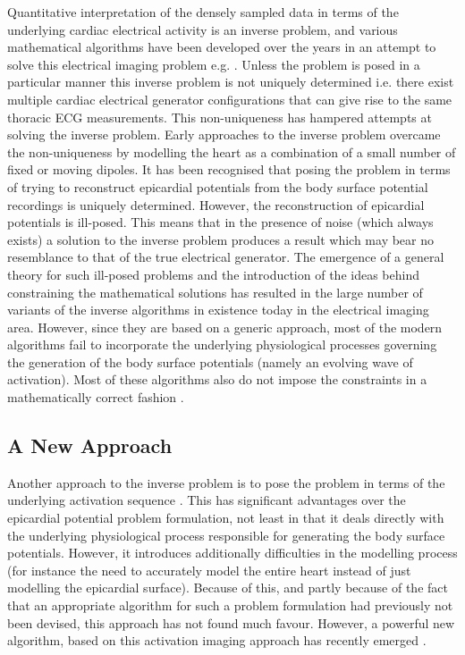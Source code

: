 Quantitative interpretation of the densely sampled data in terms of the
underlying cardiac electrical activity is an inverse problem, and various
mathematical algorithms have been developed over the years in an attempt to
solve this electrical imaging problem 
e.g. \cite{barr:1978,gulrajani:1984,martin:1975,oster:1992}. Unless the problem is
posed in a particular manner this inverse problem is not uniquely determined
i.e. there exist multiple cardiac electrical generator configurations that can
give rise to the same thoracic ECG measurements. This non-uniqueness has
hampered attempts at solving the inverse problem.  Early approaches to the
inverse problem overcame the non-uniqueness by modelling the heart as a
combination of a small number of fixed or moving dipoles.  It has been
recognised that posing the problem in terms of trying to reconstruct
epicardial potentials from the body surface potential recordings is uniquely
determined. However, the reconstruction of epicardial potentials is ill-posed.
This means that in the presence of noise (which always exists) a solution to
the inverse problem produces a result which may bear no resemblance to that of
the true electrical generator.  The emergence of a general theory for such
ill-posed problems \cite{tikhonov:1977} and the introduction of the ideas
behind constraining the mathematical solutions has resulted in the large
number of variants of the inverse algorithms in existence today in the
electrical imaging area.  However, since they are based on a generic approach,
most of the modern algorithms fail to incorporate the underlying physiological
processes governing the generation of the body surface potentials (namely an
evolving wave of activation).  Most of these algorithms also do not impose the
constraints in a mathematically correct fashion
\cite{greensite:1998b,greensite:1998}.

\subsection*{A New Approach}

Another approach to the inverse problem is to pose the problem in terms of the
underlying activation sequence \cite{huiskamp:1988}. This has significant advantages
over the epicardial potential problem formulation, not least in that it deals
directly with the underlying physiological process responsible for generating the
body surface potentials. However, it introduces additionally difficulties in the
modelling process (for instance the need to accurately model the entire heart instead
of just modelling the epicardial surface).  Because of this, and partly because of
the fact that an appropriate algorithm for such a problem formulation had
previously not been devised, this approach has not found much favour.
However, a powerful new algorithm, based on this activation imaging approach
has recently emerged \cite{greensite:1998b,huiskamp:1997}.


